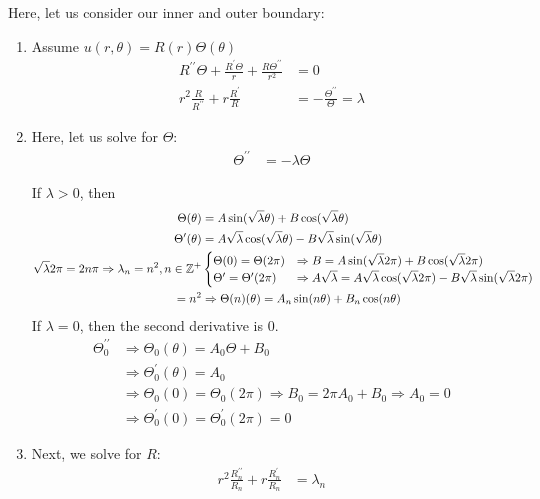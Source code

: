 \documentclass{article}
\begin{document}
\begin{enumerate}
  Here, let us consider our inner and outer boundary:
  \begin{enumerate}
    \item Assume $u(r, \theta) = R(r)\Theta(\theta)$
    \begin{align}
      R^{\prime\prime} \Theta + \frac{R^\prime \Theta}{r} + \frac{R\Theta^{\prime\prime}}{r^2} & = 0\\
      r^2 \frac{R}{R^{\prime\prime}} + r \frac{R^\prime}{R} & = - \frac{\Theta^{\prime\prime}}{\Theta} = \lambda
    \end{align}
    \item Here, let us solve for $\Theta$:
    \begin{align}
      \Theta^{\prime\prime} & = - \lambda \Theta
    \end{align}

    If $\lambda > 0$, then
    \begin{align}
      \Theta(\theta) & =
      A \sin(\sqrt \lambda \theta) + B \cos(\sqrt \lambda \theta)\\
      \Theta^\prime(\theta) & =
      A \sqrt \lambda \cos ( \sqrt \lambda \theta) - B \sqrt \lambda \sin (\sqrt \lambda \theta)\\
      \sqrt \lambda 2 \pi = 2 n \pi \Rightarrow \lambda_n = n^2, n \in \mathbb Z^+ &
      \begin{cases}
        \Theta(0) = \Theta(2\pi) & \Rightarrow
        B = A \sin(\sqrt \lambda 2 \pi) + B \cos(\sqrt \lambda 2 \pi)\\
        \Theta^\prime = \Theta^\prime(2 \pi) & \Rightarrow
        A \sqrt \lambda = A \sqrt \lambda \cos (\sqrt \lambda 2 \pi) - B \sqrt \lambda \sin (\sqrt \lambda 2 \pi)
      \end{cases}\\
      = n^2 & \Rightarrow
      \Theta(n)(\theta) = A_n \sin(n \theta) + B_n \cos(n \theta)
    \end{align}
    If $\lambda = 0$, then the second derivative is $0$.
    \begin{align}
      \Theta^{\prime\prime}_0 & \Rightarrow
      \Theta_0(\theta) = A_0\Theta + B_0\\
      & \Rightarrow \Theta^\prime_0 (\theta) = A_0\\
      & \Rightarrow \Theta_0(0) = \Theta_0(2 \pi) \Rightarrow B_0 = 2 \pi A_0 + B_0 \Rightarrow A_0 = 0\\
      & \Rightarrow \Theta^\prime_0(0) = \Theta^\prime_0 (2 \pi) = 0
    \end{align}
    \item Next, we solve for $R$:
    \begin{align}
      r^2 \frac{R^{\prime\prime}_n}{R_n} + r\frac{R^\prime_n}{R_n} & = \lambda_n
    \end{align}


\end{enumerate}
\end{enumerate}
\end{document}
